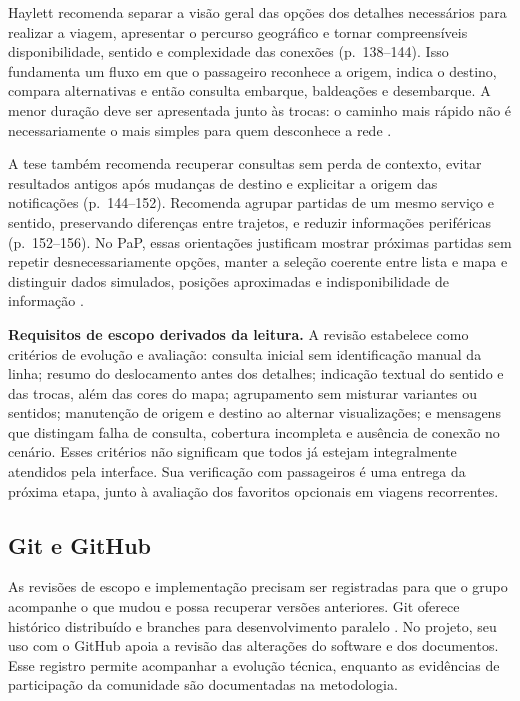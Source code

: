 \documentclass[12pt,oneside,a4paper,brazil]{abntex2}
\begin{document}
Haylett recomenda separar a visão geral das opções dos detalhes necessários para realizar a viagem, apresentar o percurso geográfico e tornar compreensíveis disponibilidade, sentido e complexidade das conexões (p.~138--144). Isso fundamenta um fluxo em que o passageiro reconhece a origem, indica o destino, compara alternativas e então consulta embarque, baldeações e desembarque. A menor duração deve ser apresentada junto às trocas: o caminho mais rápido não é necessariamente o mais simples para quem desconhece a rede \citep{haylett2018}.

A tese também recomenda recuperar consultas sem perda de contexto, evitar resultados antigos após mudanças de destino e explicitar a origem das notificações (p.~144--152). Recomenda agrupar partidas de um mesmo serviço e sentido, preservando diferenças entre trajetos, e reduzir informações periféricas (p.~152--156). No PaP, essas orientações justificam mostrar próximas partidas sem repetir desnecessariamente opções, manter a seleção coerente entre lista e mapa e distinguir dados simulados, posições aproximadas e indisponibilidade de informação \citep{haylett2018}.

\textbf{Requisitos de escopo derivados da leitura.} A revisão estabelece como critérios de evolução e avaliação: consulta inicial sem identificação manual da linha; resumo do deslocamento antes dos detalhes; indicação textual do sentido e das trocas, além das cores do mapa; agrupamento sem misturar variantes ou sentidos; manutenção de origem e destino ao alternar visualizações; e mensagens que distingam falha de consulta, cobertura incompleta e ausência de conexão no cenário. Esses critérios não significam que todos já estejam integralmente atendidos pela interface. Sua verificação com passageiros é uma entrega da próxima etapa, junto à avaliação dos favoritos opcionais em viagens recorrentes.

\subsection{Git e GitHub}
As revisões de escopo e implementação precisam ser registradas para que o grupo acompanhe o que mudou e possa recuperar versões anteriores. Git oferece histórico distribuído e branches para desenvolvimento paralelo \citep{git}. No projeto, seu uso com o GitHub apoia a revisão das alterações do software e dos documentos. Esse registro permite acompanhar a evolução técnica, enquanto as evidências de participação da comunidade são documentadas na metodologia.
\end{document}

